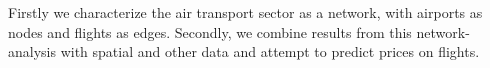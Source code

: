 \label{sec:intro}
Firstly we characterize the air transport sector as a network, with airports as nodes and flights as edges. Secondly, we combine results from this network-analysis with spatial and other data and attempt to predict prices on flights.
